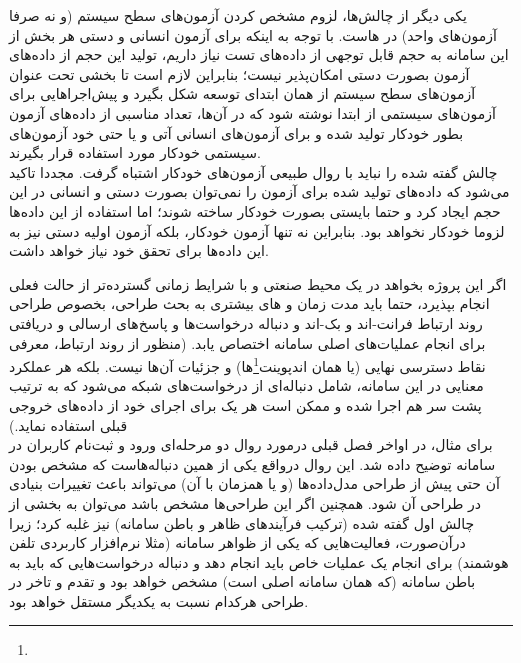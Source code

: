 
یکی دیگر از چالش‌ها، لزوم مشخص کردن آزمون‌های سطح سیستم (و نه صرفا آزمون‌های واحد) در هاست. با توجه به اینکه برای آزمون انسانی و دستی هر بخش از این سامانه به حجم قابل توجهی از داده‌های تست نیاز داریم، تولید این حجم از داده‌های آزمون بصورت دستی امکان‌پذیر نیست؛ بنابراین لازم است تا بخشی تحت عنوان آزمون‌های سطح سیستم از همان ابتدای توسعه شکل بگیرد و پیش‌اجراهایی برای آزمون‌های سیستمی از ابتدا نوشته شود که در آن‌ها، تعداد مناسبی از داده‌های آزمون بطور خودکار تولید شده و برای آزمون‌های انسانی آتی و یا حتی خود آزمون‌های سیستمی خودکار مورد استفاده قرار بگیرند.\\

چالش گفته شده را نباید با روال طبیعی آزمون‌های خودکار اشتباه گرفت. مجددا تاکید می‌شود که داده‌های تولید شده برای آزمون را نمی‌توان بصورت دستی و انسانی در این حجم ایجاد کرد و حتما بایستی بصورت خودکار ساخته شوند؛ اما استفاده از این داده‌ها لزوما خودکار نخواهد بود. بنابراین نه تنها آزمون خودکار، بلکه آزمون اولیه دستی نیز به این داده‌ها برای تحقق خود نیاز خواهد داشت.\\

\newpage


اگر این پروژه بخواهد در یک محیط صنعتی و با شرایط زمانی گسترده‌تر از حالت فعلی انجام بپذیرد، حتما باید مدت زمان و های بیشتری به بحث طراحی، بخصوص طراحی روند ارتباط فرانت-اند و بک-اند و دنباله درخواست‌ها و پاسخ‌های ارسالی و دریافتی برای انجام عملیات‌های اصلی سامانه اختصاص یابد. (منظور از روند ارتباط، معرفی نقاط دسترسی نهایی (یا همان اندپوینت\footnote{}‌ها) و جزئیات آن‌ها نیست. بلکه هر عملکرد معنایی در این سامانه، شامل دنباله‌ای از درخواست‌های شبکه می‌شود که به ترتیب پشت سر هم اجرا شده و ممکن است هر یک برای اجرای خود از داده‌های خروجی قبلی استفاده نماید.)\\

برای مثال، در اواخر فصل قبلی درمورد روال دو مرحله‌ای ورود و ثبت‌نام کاربران در سامانه توضیح داده شد. این روال درواقع یکی از همین دنباله‌هاست که مشخص بودن آن حتی پیش از طراحی مدل‌داده‌ها (و یا همزمان با آن) می‌تواند باعث تغییرات بنیادی در طراحی آن شود. همچنین اگر این طراحی‌ها مشخص باشد می‌توان به بخشی از چالش اول گفته شده (ترکیب فرآیندهای ظاهر و باطن سامانه) نیز غلبه کرد؛ زیرا درآن‌صورت، فعالیت‌هایی که یکی از ظواهر سامانه (مثلا نرم‌افزار کاربردی تلفن هوشمند) برای انجام یک عملیات خاص باید انجام دهد و دنباله درخواست‌هایی که باید به باطن سامانه (که همان سامانه اصلی است) مشخص خواهد بود و تقدم و تاخر در طراحی هرکدام نسبت به یکدیگر مستقل خواهد بود.


